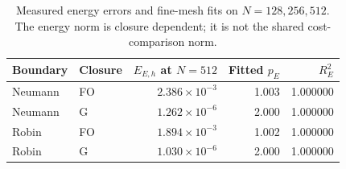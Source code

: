 \begin{table}[H]
\centering
\small
\setlength{\tabcolsep}{4pt}
\begin{tabular}{llrrr}
\toprule
Boundary & Closure & $E_{E,h}$ at $N=512$ & Fitted $p_E$ & $R_E^2$ \\
\midrule
Neumann & FO & $2.386\times10^{-3}$ & 1.003 & 1.000000 \\
Neumann & G & $1.262\times10^{-6}$ & 2.000 & 1.000000 \\
Robin & FO & $1.894\times10^{-3}$ & 1.002 & 1.000000 \\
Robin & G & $1.030\times10^{-6}$ & 2.000 & 1.000000 \\
\bottomrule
\end{tabular}
\caption{Measured energy errors and fine-mesh fits on $N=128,256,512$. The energy norm is closure dependent; it is not the shared cost-comparison norm.}
\label{tab:energy-summary}
\end{table}
